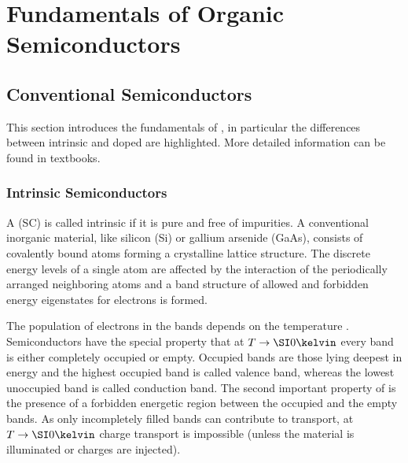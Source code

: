 %
\chapter{Fundamentals of Organic Semiconductors}\label{chap:Theo}

%

\newpage

\section{Conventional Semiconductors}\label{sec:TheoConventionalSemiconductors}
This section introduces the fundamentals of \CSCs, in particular the differences between intrinsic and doped \SCs are highlighted. More detailed information can be found in textbooks\cite{Sze,Thuselt,EnderleinSchenk}.
%
\subsection{Intrinsic Semiconductors}\label{sec:Theo-inorg-Bandstructure}%
A \SC (SC) is called intrinsic if it is pure and free of impurities.
A conventional inorganic \SC material, like silicon (Si) or gallium arsenide (GaAs), consists of covalently bound atoms forming a crystalline lattice structure. The discrete energy levels of a single atom are affected by the interaction of the periodically arranged neighboring atoms and a band structure of allowed and forbidden energy eigenstates for electrons is formed.

The population of electrons in the bands depends on the temperature \T. Semiconductors have the special property that at $\T\rightarrow\K{0}$ every band is either completely occupied or empty. Occupied bands are those lying deepest in energy and the highest occupied band is called valence band, whereas the lowest unoccupied band is called conduction band.
The second important property of \SCs is the presence of a forbidden energetic region between the occupied and the empty bands. As only incompletely filled bands can contribute to transport, at $T\rightarrow\K{0}$ charge transport is impossible (unless the material is illuminated or charges are injected).

